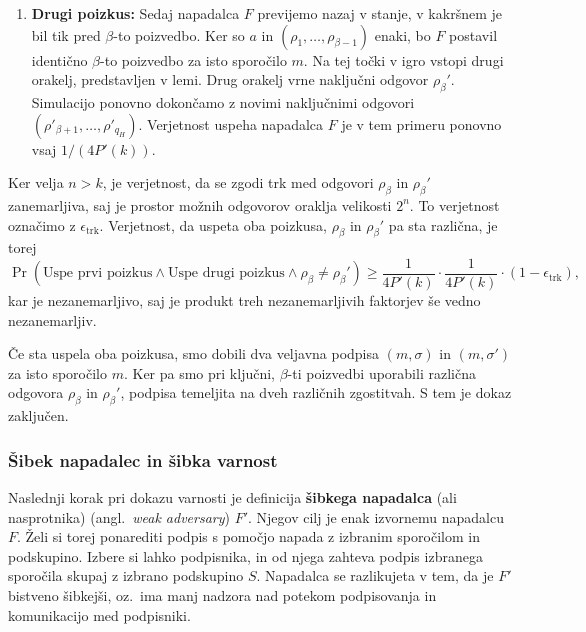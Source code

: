 \begin{dokaz}
\begin{enumerate}
        \item \textbf{Drugi poizkus:} Sedaj napadalca $F$ previjemo nazaj v stanje, v kakršnem je bil
            tik pred $\beta$-to poizvedbo. Ker so $a$ in $(\rho_1, \dots, \rho_{\beta-1})$ enaki, bo
            $F$ postavil identično $\beta$-to poizvedbo za isto sporočilo $m$. Na tej točki v igro
            vstopi drugi orakelj, predstavljen v lemi. Drug orakelj vrne naključni odgovor
            $\rho_\beta'$. Simulacijo ponovno dokončamo z novimi naključnimi odgovori
            $(\rho'_{\beta+1}, \dots, \rho'_{q_H})$. Verjetnost uspeha napadalca $F$ je v tem primeru ponovno
            vsaj $1/(4P'(k))$.
    \end{enumerate}

    Ker velja $n > k$, je verjetnost, da se zgodi trk med odgovori $\rho_\beta$ in $\rho_\beta'$
    zanemarljiva, saj je prostor možnih odgovorov oraklja velikosti $2^n$. To verjetnost označimo
    z $\epsilon_{\text{trk}}$. Verjetnost, da uspeta oba poizkusa, $\rho_\beta$ in $\rho_\beta'$ pa
    sta različna, je torej
    $$
    \Pr(\text{Uspe prvi poizkus} \wedge \text{Uspe drugi poizkus} \wedge \rho_\beta \neq \rho_\beta') \geq
    \frac{1}{4P'(k)} \cdot \frac{1}{4P'(k)} \cdot (1 - \epsilon_{\text{trk}}),
    $$
    kar je nezanemarljivo, saj je produkt treh nezanemarljivih faktorjev še vedno nezanemarljiv.

    Če sta uspela oba poizkusa, smo dobili dva veljavna podpisa $(m, \sigma)$ in
    $(m, \sigma')$ za isto sporočilo $m$. Ker pa smo pri ključni, $\beta$-ti poizvedbi
    uporabili različna odgovora $\rho_\beta$ in $\rho_\beta'$, podpisa temeljita na dveh
    različnih zgostitvah. S tem je dokaz zaključen.
\end{dokaz}

\subsubsection{Šibek napadalec in šibka varnost}
Naslednji korak pri dokazu varnosti je definicija \textbf{šibkega napadalca} (ali nasprotnika) (angl.\
\textit{weak adversary}) $F'$. Njegov cilj je enak izvornemu napadalcu $F$. Želi si torej ponarediti podpis
s pomočjo napada z izbranim sporočilom in podskupino. Izbere si lahko podpisnika, in od njega
zahteva podpis izbranega sporočila skupaj z izbrano podskupino $S$. Napadalca se razlikujeta v tem,
da je $F'$ bistveno šibkejši, oz.\ ima manj nadzora nad potekom podpisovanja in komunikacijo med
podpisniki.


